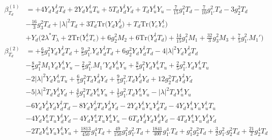 {\allowdisplaybreaks  \begin{align} 
\beta_{T_d}^{(1)} & =  
+4 {Y_d  Y_{d}^{\dagger}  T_d} +2 {Y_d  Y_{u}^{\dagger}  T_u} +5 {T_d  Y_{d}^{\dagger}  Y_d} +{T_d  Y_{u}^{\dagger}  Y_u}-\frac{7}{15} g_{1}^{2} T_d -\frac{7}{10} g_{1'}^{2} T_d -3 g_{2}^{2} T_d \nonumber \\ 
 &-\frac{16}{3} g_{3}^{2} T_d +|\lambda|^2 T_d +3 T_d \mbox{Tr}\Big({Y_d  Y_{d}^{\dagger}}\Big) +T_d \mbox{Tr}\Big({Y_e  Y_{e}^{\dagger}}\Big) \nonumber \\ 
 &+Y_d \Big(2 \lambda^* T_{\lambda}  + 2 \mbox{Tr}\Big({Y_{e}^{\dagger}  T_e}\Big)  + 6 g_{2}^{2} M_2  + 6 \mbox{Tr}\Big({Y_{d}^{\dagger}  T_d}\Big)  + \frac{14}{15} g_{1}^{2} M_1  + \frac{32}{3} g_{3}^{2} M_3  + \frac{7}{5} g_{1'}^{2} M_1' \Big)\\ 
\beta_{T_d}^{(2)} & =  
+\frac{6}{5} g_{1}^{2} {Y_d  Y_{d}^{\dagger}  T_d} +\frac{9}{5} g_{1'}^{2} {Y_d  Y_{d}^{\dagger}  T_d} +6 g_{2}^{2} {Y_d  Y_{d}^{\dagger}  T_d} -4 |\lambda|^2 {Y_d  Y_{d}^{\dagger}  T_d} \nonumber \\ 
 &-\frac{8}{5} g_{1}^{2} M_1 {Y_d  Y_{u}^{\dagger}  Y_u} -\frac{2}{5} g_{1'}^{2} M_1' {Y_d  Y_{u}^{\dagger}  Y_u} +\frac{8}{5} g_{1}^{2} {Y_d  Y_{u}^{\dagger}  T_u} +\frac{2}{5} g_{1'}^{2} {Y_d  Y_{u}^{\dagger}  T_u} \nonumber \\ 
 &-2 |\lambda|^2 {Y_d  Y_{u}^{\dagger}  T_u} +\frac{6}{5} g_{1}^{2} {T_d  Y_{d}^{\dagger}  Y_d} +\frac{9}{5} g_{1'}^{2} {T_d  Y_{d}^{\dagger}  Y_d} +12 g_{2}^{2} {T_d  Y_{d}^{\dagger}  Y_d} \nonumber \\ 
 &-5 |\lambda|^2 {T_d  Y_{d}^{\dagger}  Y_d} +\frac{4}{5} g_{1}^{2} {T_d  Y_{u}^{\dagger}  Y_u} +\frac{1}{5} g_{1'}^{2} {T_d  Y_{u}^{\dagger}  Y_u} - |\lambda|^2 {T_d  Y_{u}^{\dagger}  Y_u} \nonumber \\ 
 &-6 {Y_d  Y_{d}^{\dagger}  Y_d  Y_{d}^{\dagger}  T_d} -8 {Y_d  Y_{d}^{\dagger}  T_d  Y_{d}^{\dagger}  Y_d} -2 {Y_d  Y_{u}^{\dagger}  Y_u  Y_{d}^{\dagger}  T_d} -4 {Y_d  Y_{u}^{\dagger}  Y_u  Y_{u}^{\dagger}  T_u} \nonumber \\ 
 &-4 {Y_d  Y_{u}^{\dagger}  T_u  Y_{d}^{\dagger}  Y_d} -4 {Y_d  Y_{u}^{\dagger}  T_u  Y_{u}^{\dagger}  Y_u} -6 {T_d  Y_{d}^{\dagger}  Y_d  Y_{d}^{\dagger}  Y_d} -4 {T_d  Y_{u}^{\dagger}  Y_u  Y_{d}^{\dagger}  Y_d} \nonumber \\ 
 &-2 {T_d  Y_{u}^{\dagger}  Y_u  Y_{u}^{\dagger}  Y_u} +\frac{1813}{450} g_{1}^{4} T_d +\frac{49}{150} g_{1}^{2} g_{1'}^{2} T_d +\frac{1841}{400} g_{1'}^{4} T_d +g_{1}^{2} g_{2}^{2} T_d +\frac{3}{2} g_{1'}^{2} g_{2}^{2} T_d +\frac{21}{2} g_{2}^{4} T_d \nonumber \\ 

\end{align}}

